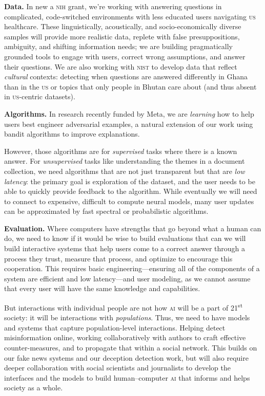 \documentclass[11pt]{amsart}
\newcommand{\abr}[1]{\textsc{#1}}
\begin{document}
{\bf Data.}
%
In new a \abr{nih} grant, we're working with answering
questions in complicated, code-switched environments with
less educated users navigating \abr{us} healthcare.
%
These linguistically, acoustically, and socio-economically diverse
samples will provide more realistic data, replete with false presuppositions, ambiguity, and
shifting information needs; we are building pragmatically grounded tools to engage with users, correct wrong assumptions, and answer their questions.
%
We are also working with \abr{nist} to develop data that 
reflect \emph{cultural} contexts: detecting when questions
are answered differently in Ghana than in the \abr{us} or topics that
only people in Bhutan care about (and thus absent in
\abr{us}-centric datasets).

{\bf Algorithms.} In research recently funded by Meta, we are \emph{learning} how to help users best
engineer adversarial examples, a natural extension of our work using
bandit algorithms to improve explanations.

However, those algorithms are for \emph{supervised} tasks where there
is a known answer.
%
For \emph{unsupervised} tasks like understanding the themes in a
document collection, we need algorithms
that are not just transparent but that are \emph{low latency}: the primary
goal is exploration of the dataset, and the user needs to be able to
quickly provide feedback to the algorithm.
%
While eventually we will need to connect to expensive, difficult to
compute neural models, many user updates can be approximated by fast
spectral or probabilistic algorithms.

{\bf Evaluation.}
%
Where computers have strengths that go beyond what a human can do, we
need to know if it would be wise to build evaluations that can we
will build interactive systems that help users come to a correct
answer through a process they trust, measure that process, and
optimize to encourage this cooperation.
%
This requires basic engineering---ensuring all of the components of
a system are efficient and low latency---and user modeling, as we
cannot assume that every user will have the same knowledge and
capabilities.
%
%

But interactions with individual people are not how \abr{ai} will be a
part of 21\textsuperscript{st} society: it will be interactions with
\emph{populations}.
%
Thus, we need to have models and systems that capture population-level
interactions.
%
Helping detect misinformation online, working collaboratively with
authors to craft effective counter-measures, and to propagate that
within a social network.
%
This builds on our fake news systems and our deception detection work,
but will also require deeper collaboration with social scientists and
journalists to develop the interfaces and the models to build
human--computer \abr{ai} that informs and helps society as a whole.
\end{document}
